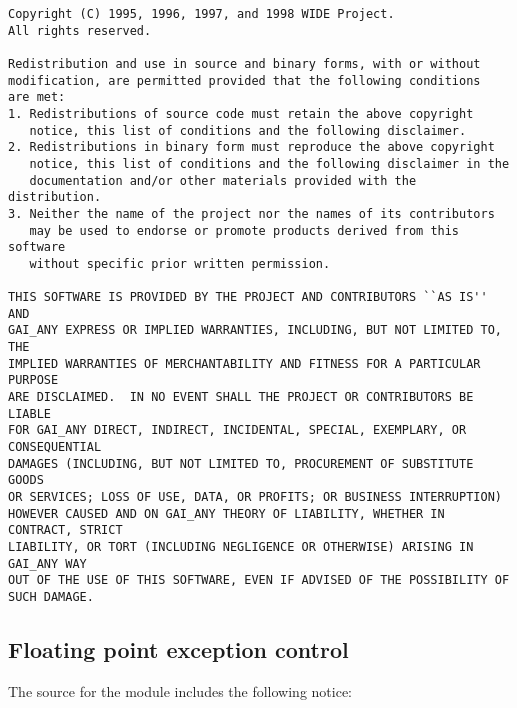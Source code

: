 \begin{verbatim}      
Copyright (C) 1995, 1996, 1997, and 1998 WIDE Project.
All rights reserved.
 
Redistribution and use in source and binary forms, with or without
modification, are permitted provided that the following conditions
are met:
1. Redistributions of source code must retain the above copyright
   notice, this list of conditions and the following disclaimer.
2. Redistributions in binary form must reproduce the above copyright
   notice, this list of conditions and the following disclaimer in the
   documentation and/or other materials provided with the distribution.
3. Neither the name of the project nor the names of its contributors
   may be used to endorse or promote products derived from this software
   without specific prior written permission.

THIS SOFTWARE IS PROVIDED BY THE PROJECT AND CONTRIBUTORS ``AS IS'' AND
GAI_ANY EXPRESS OR IMPLIED WARRANTIES, INCLUDING, BUT NOT LIMITED TO, THE
IMPLIED WARRANTIES OF MERCHANTABILITY AND FITNESS FOR A PARTICULAR PURPOSE
ARE DISCLAIMED.  IN NO EVENT SHALL THE PROJECT OR CONTRIBUTORS BE LIABLE
FOR GAI_ANY DIRECT, INDIRECT, INCIDENTAL, SPECIAL, EXEMPLARY, OR CONSEQUENTIAL
DAMAGES (INCLUDING, BUT NOT LIMITED TO, PROCUREMENT OF SUBSTITUTE GOODS
OR SERVICES; LOSS OF USE, DATA, OR PROFITS; OR BUSINESS INTERRUPTION)
HOWEVER CAUSED AND ON GAI_ANY THEORY OF LIABILITY, WHETHER IN CONTRACT, STRICT
LIABILITY, OR TORT (INCLUDING NEGLIGENCE OR OTHERWISE) ARISING IN GAI_ANY WAY
OUT OF THE USE OF THIS SOFTWARE, EVEN IF ADVISED OF THE POSSIBILITY OF
SUCH DAMAGE.
\end{verbatim}



\subsection{Floating point exception control}

The source for the  module includes the following notice:

